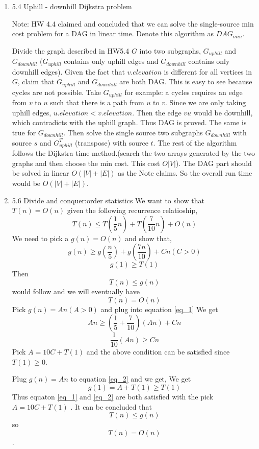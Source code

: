 \documentclass[11pt]{article}
\begin{document}
\begin{enumerate}
\item 5.4 Uphill - downhill Dijkstra problem

Note: HW 4.4 claimed and concluded that we can solve the single-source min cost problem for a DAG in linear time. Denote this algorithm as $DAG_{min}$. 

Divide the graph described in HW5.4 $G$ into two subgraphs, $G_{uphill}$ and $G_{downhill}$ ($G_{uphill}$ contains only uphill edges and $G_{downhill}$ contains only downhill edges). Given the fact that $v.elevation$ is different for all vertices in $G$, claim that $G_{uphill}$ and $G_{downhill}$ are both DAG. This is easy to see because cycles are not possible. Take $G_{uphill}$ for example: a cycles requires an edge from $v$ to $u$ such that there is a path from $u$ to $v$. Since we are only taking uphill edges, $u.elevation < v.elevation$. Then the edge $vu$ would be downhill, which contradicts with the uphill graph. Thus DAG is proved. The same is true for $G_{downhill}$. Then solve the single source two subgraphs $G_{downhill}$ with source $s$ and $G^T_{uphill}$ (transpose) with source $t$. The rest of the algorithm follows the Dijkstra time method.(search the two arrays generated by the two graphs and then choose the min cost. This cost $O|V|$). The DAG part should be solved in linear $O(|V|+|E|)$ as the Note claims. So the overall run time would be $O(|V|+|E|)$.

\item 5.6 Divide and conquer:order statistics
We want to show that $T(n) = O(n)$ given the following recurrence relatioship,
\[ T(n) \leq T(\frac{1}{5}n) + T(\frac{7}{10}n) + O(n)\]
We need to pick a $g(n) = O(n)$ and show that,
\begin{equation} \label{eq_1}
g(n) \geq g(\frac{n}{5})+g(\frac{7n}{10})+Cn (C>0)
\end{equation}
\begin{equation} \label{eq_2}
g(1) \geq T(1)
\end{equation}
Then
\[ T(n) \leq g(n) \] would follow and we will eventually have 
\[ T(n) = O(n)\]
Pick  $g(n) = An (A > 0) $ and plug into equation \ref{eq_1}
We get \[ An \geq (\frac{1}{5} + \frac{7}{10})(An) + Cn\]
\[\frac{1}{10}(An) \geq Cn\]
Pick $A = 10C + T(1)$  and the above condition can be satisfied since $T(1) \geq 0$. 

Plug $g(n) = An$ to equation \ref{eq_2} and we get, 
We get \[g(1) = A+T(1) \geq T(1)\]
Thus equaton \ref{eq_1} and \ref{eq_2} are both satisfied with the pick $A=10C + T(1)$ . It can be concluded that \[T(n) \leq g(n)\]
so \[T(n) = O(n)\].



\end{enumerate}
\end{document}
